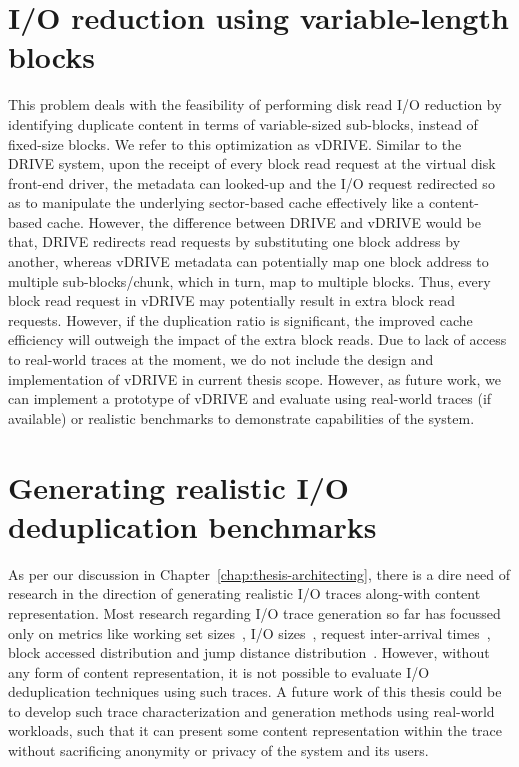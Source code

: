 \section{I/O reduction using variable-length blocks}
This problem deals with the feasibility of performing disk
read I/O reduction by identifying duplicate content in terms of
variable-sized sub-blocks, instead of fixed-size blocks.
We refer to this optimization as vDRIVE.
Similar to the DRIVE system, upon the receipt 
of every block read request at the virtual disk front-end driver, 
the metadata can looked-up and the I/O
request redirected so as to manipulate the underlying 
sector-based cache effectively like a content-based cache. 
However, the difference between DRIVE and vDRIVE would be that, DRIVE
redirects read requests by substituting one block address by 
another, whereas vDRIVE metadata can potentially map one block
address to multiple sub-blocks/chunk, which in turn, map to multiple blocks.
Thus, every block read request in vDRIVE may potentially result
in extra block read requests. However, if the duplication ratio
is significant, the improved cache efficiency will outweigh the
impact of the extra block reads.
Due to lack of access to real-world traces at the moment, we
do not include the design and implementation of vDRIVE in current
thesis scope.
However, as future work, we can implement a prototype of vDRIVE
and evaluate using real-world traces (if available) or
realistic benchmarks to demonstrate capabilities of the system.

\section{Generating realistic I/O deduplication benchmarks}
As per our discussion in Chapter~\ref{chap:thesis-architecting}, there
is a dire need of research in the direction of generating
realistic I/O traces along-with content representation. Most research
regarding I/O trace generation so far has focussed only on metrics
like working set sizes~\cite{working-set}, 
I/O sizes~\cite{flexi-replay}, 
request inter-arrival times~\cite{storagereplay},
block accessed distribution and
jump distance distribution~\cite{jump-based-synthetic}. However, 
without any form of content representation, it is not possible
to evaluate I/O deduplication techniques using such traces. 
A future work of this thesis could be to develop such trace 
characterization and generation methods using real-world
workloads, such that it can present some
content representation within the trace without sacrificing 
anonymity or privacy of the system and its users.

